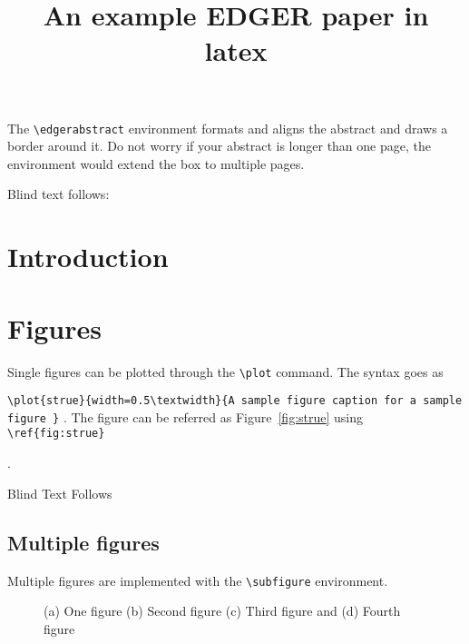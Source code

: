 \documentclass{edger}
\begin{document}
\title{An example EDGER paper in latex
}



\institution{}

\begin{edgerabstract}
The \verb|\edgerabstract| environment formats and aligns the abstract and draws a border around it. Do not worry if your abstract is longer than one page, the environment would extend the box to multiple pages. 

Blind text follows: \lipsum[1]
\end{edgerabstract}



\section*{Introduction}

\lipsum[1-7]   


\section*{Figures}

Single figures can be plotted through the \verb|\plot| command. The syntax goes as

 \verb|\plot{strue}{width=0.5\textwidth}{A sample figure caption for a sample figure }| .
 The figure can be referred as Figure~\ref{fig:strue} using \verb|\ref{fig:strue}|

.


Blind Text Follows
\lipsum[1-7]  
\subsection*{Multiple  figures}

Multiple figures are implemented with the \verb|\subfigure| environment. 
\begin{figure}
	\centering
	\begin{subfigure}[c]{0.495\textwidth}
	\end{subfigure}
	\begin{subfigure}[c]{0.495\textwidth}
	\end{subfigure}
	\begin{subfigure}[c]{0.495\textwidth}
	\end{subfigure}
	\begin{subfigure}[c]{0.495\textwidth}
	\end{subfigure}
\caption{(a) One figure (b) Second figure (c) Third figure and (d) Fourth figure}	
\label{fig:bigfig}
\end{figure}
\end{document}
